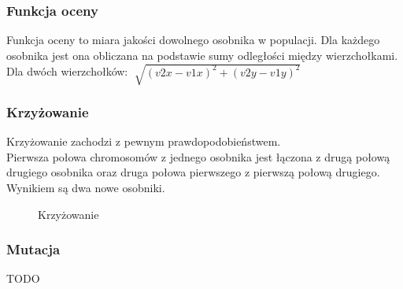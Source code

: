 \documentclass[a4paper,12pt]{article}
\begin{document}
\subsubsection{Funkcja oceny}
Funkcja oceny to miara jakości dowolnego osobnika w populacji. Dla każdego osobnika jest ona obliczana na podstawie sumy odległości między wierzchołkami.
\\
Dla dwóch wierzchołków: $\sqrt[]{(v2x-v1x)^{2} + (v2y-v1y)^{2}}$
\subsubsection{Krzyżowanie}
Krzyżowanie zachodzi z pewnym prawdopodobieństwem.
\\
Pierwsza połowa chromosomów z jednego osobnika jest łączona z drugą połową drugiego osobnika oraz druga połowa pierwszego z pierwszą połową drugiego. Wynikiem są dwa nowe osobniki. 
\begin{figure}[htbp]
\caption{Krzyżowanie}
\end{figure}
\subsubsection{Mutacja}
TODO
\end{document}
